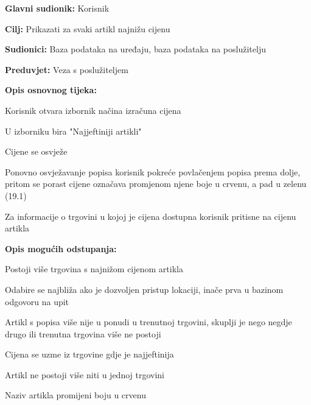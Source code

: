 				
				\noindent {}
				\begin{packed_item}
					\item \textbf{Glavni sudionik:} Korisnik
					\item  \textbf{Cilj:} Prikazati za svaki artikl najnižu cijenu
					\item  \textbf{Sudionici:} Baza podataka na uređaju, baza podataka na poslužitelju
					\item  \textbf{Preduvjet:} Veza s poslužiteljem
					\item  \textbf{Opis osnovnog tijeka:}
					\item[] \begin{packed_enum}
						\item Korisnik otvara izbornik načina izračuna cijena
						\item U izborniku bira "Najjeftiniji artikli"
						\item Cijene se osvježe
						\item Ponovno osvježavanje popisa korisnik pokreće povlačenjem popisa prema dolje, pritom se porast cijene označava promjenom njene boje u crvenu, a pad u zelenu (19.1)
						\item Za informacije o trgovini u kojoj je cijena dostupna korisnik pritisne na cijenu artikla
					\end{packed_enum}
					\item  \textbf{Opis mogućih odstupanja:}
					\item[] \begin{packed_item}
						\item[3.a] Postoji više trgovina s najnižom cijenom artikla
						\item[] \begin{packed_enum}
							\item Odabire se najbliža ako je dozvoljen pristup lokaciji, inače prva u bazinom odgovoru na upit
						\end{packed_enum}
						\item[4.a] Artikl s popisa više nije u ponudi u trenutnoj trgovini, skuplji je nego negdje drugo ili trenutna trgovina više ne postoji
						\item[] \begin{packed_enum}
							\item Cijena se uzme iz trgovine gdje je najjeftinija
						\end{packed_enum}
						\item[4.b] Artikl ne postoji više niti u jednoj trgovini
						\item[] \begin{packed_enum}
							\item Naziv artikla promijeni boju u crvenu
						\end{packed_enum}
					\end{packed_item}
				\end{packed_item}
			
